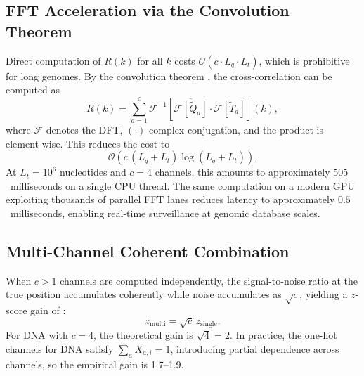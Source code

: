 \documentclass[twocolumn,11pt,a4paper]{article}
\theoremstyle{definition}
\theoremstyle{remark}
\newcommand{\bigO}{\mathcal{O}}
\begin{document}
\subsection{FFT Acceleration via the Convolution Theorem}

Direct computation of $R(k)$ for all $k$ costs $\bigO(c \cdot L_q \cdot L_t)$,
which is prohibitive for long genomes. By the convolution theorem
\citep{oppenheim2009}, the cross-correlation can be computed as
\begin{equation}
  R(k) = \sum_{a=1}^{c}
    \mathcal{F}^{-1}\!\left[\overline{\mathcal{F}[\widetilde{Q}_a]}\cdot \mathcal{F}[\widetilde{T}_a]\right](k),
  \label{eq:fft_xcorr}
\end{equation}
where $\mathcal{F}$ denotes the DFT, $\overline{(\cdot)}$ complex conjugation,
and the product is element-wise. This reduces the cost to
\begin{equation}
  \bigO\!\left(c\,(L_q + L_t)\log(L_q + L_t)\right).
\end{equation}
At $L_t = 10^6$ nucleotides and $c = 4$ channels, this amounts to approximately
$505$~milliseconds on a single CPU thread. The same computation on a modern GPU
exploiting thousands of parallel FFT lanes \citep{moreland2003,
govindaraju2008} reduces latency to approximately $0.5$~milliseconds, enabling
real-time surveillance at genomic database scales.

\subsection{Multi-Channel Coherent Combination}

When $c > 1$ channels are computed independently, the signal-to-noise ratio at
the true position accumulates coherently while noise accumulates as
$\sqrt{c}$, yielding a $z$-score gain of \citep{vantrees2001}:
\begin{equation}
  z_{\text{multi}} = \sqrt{c}\, z_{\text{single}}.
  \label{eq:zchan}
\end{equation}
For DNA with $c = 4$, the theoretical gain is $\sqrt{4} = 2$. In practice, the
one-hot channels for DNA satisfy $\sum_a X_{a,i} = 1$, introducing partial
dependence across channels, so the empirical gain is 1.7--1.9.
\end{document}
